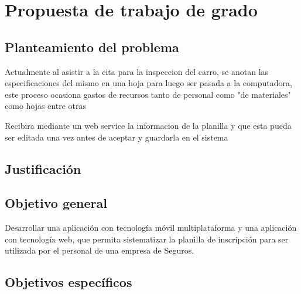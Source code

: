 \chapter{Propuesta de trabajo de grado}

\section{Planteamiento del problema}


Actualmente al asistir a la cita para la inspeccion del carro, se anotan las especificaciones del mismo en una hoja para luego ser pasada a la computadora, este proceso ocasiona gastos de recursos tanto de personal como "de materiales" como hojas entre otras  

Recibira mediante un web service la informacion de la planilla y que esta pueda ser editada una vez antes de aceptar y guardarla en el sistema

\section{Justificación}



\section{Objetivo general}

Desarrollar una aplicación con tecnología móvil multiplataforma y una aplicación con tecnología web, que permita sistematizar la planilla de inscripción para ser utilizada por el personal de una empresa de Seguros. 

\section{Objetivos específicos}

